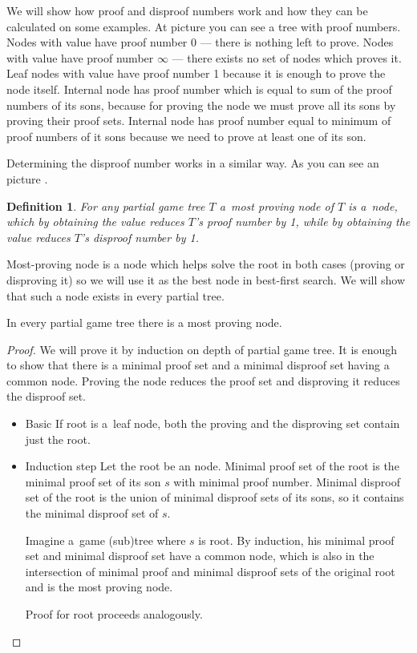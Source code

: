 We will show how proof and disproof numbers work and how they can be calculated
on some examples. At picture  you can see a tree with proof numbers.
Nodes with value \value{true} have proof number 0 --- there is nothing left to
prove. Nodes with value \value{false} have proof number $ \infty $ --- there
exists no set of nodes which proves it. Leaf nodes with value \value{unknown}
have proof number 1 because it is enough to prove the node itself. Internal
 node has proof number which is equal to sum of the proof numbers of
its sons, because for proving the  node we must prove all its sons by
proving their proof sets. Internal  node has proof number equal to
minimum of proof numbers of it sons because we need to prove at least one of
its son.

Determining the disproof number works in a similar way. As you can see an picture
. 

\newtheorem*{mostProvingNode}{Definition}	
\begin{mostProvingNode}
	For any partial game tree $T$ a~{\sl most proving node} of $T$ is a~node, which by 
	obtaining the value \value{true} reduces $T$'s proof number by 1, while by obtaining the
	value \value{false} reduces $T$'s disproof number by 1.
\end{mostProvingNode}

Most-proving node is a node which helps solve the root in both cases (proving or disproving it)
so we will use 
it as the best node in best-first search. We will show that such a node exists in every
partial tree.

\begin{lemma}
	In every partial game tree there is a most proving node.
\end{lemma}

\begin{proof}

	We will prove it by induction on depth of partial game tree.
	It is enough to show that there is a minimal proof set and a minimal disproof set having a 
	common node. Proving the node reduces the proof set and disproving it reduces the
	disproof set.

	\begin{itemize} 
		\item{Basic} 
			If root is a~leaf node, both the proving and the disproving set 
			contain just the root.
		\item{Induction step}
			Let the root be an  node. Minimal proof set of the root is the minimal proof set
			of its son $s$ with minimal proof number. Minimal disproof set of the root
			is the union of minimal disproof sets of its sons, so it contains
			the minimal disproof set of $s$.

			Imagine a~game (sub)tree where $s$ is root. By induction, his
			minimal proof set and minimal disproof set have a common node, which is also 
			in the intersection of minimal proof and minimal disproof sets of the original root and
			is the most proving node.

			Proof for  root proceeds analogously.
	\end{itemize}
\end{proof}

